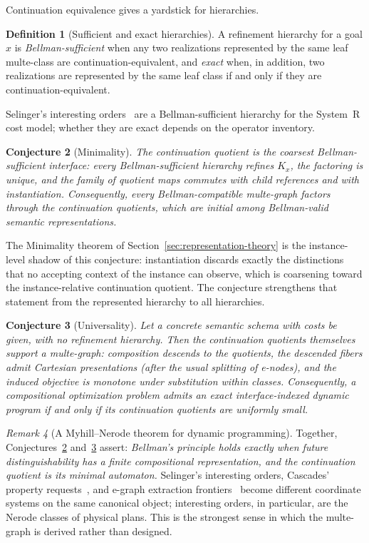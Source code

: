 \documentclass[sigconf,nonacm]{acmart}
\theoremstyle{definition}
\newtheorem{definition}{Definition}[section]
\theoremstyle{plain}
\newtheorem{conjecture}[definition]{Conjecture}
\theoremstyle{remark}
\newtheorem{remark}[definition]{Remark}
\begin{document}
Continuation equivalence gives a yardstick for hierarchies.

\begin{definition}[Sufficient and exact hierarchies]
A refinement hierarchy for a goal $x$ is \emph{Bellman-sufficient}
when any two realizations represented by the same leaf multe-class
are continuation-equivalent, and \emph{exact} when, in addition, two
realizations are represented by the same leaf class if and only if
they are continuation-equivalent.
\end{definition}

Selinger's interesting orders~\cite{selinger1979access} are a
Bellman-sufficient hierarchy for the System~R cost model; whether
they are exact depends on the operator inventory.

\begin{conjecture}[Minimality]
\label{conj:minimality}
The continuation quotient is the coarsest Bellman-sufficient
interface: every Bellman-sufficient hierarchy refines $K_x$, the
factoring is unique, and the family of quotient maps commutes with
child references and with instantiation.  Consequently, every
Bellman-compatible multe-graph factors through the continuation
quotients, which are initial among Bellman-valid semantic
representations.
\end{conjecture}

The Minimality theorem of Section~\ref{sec:representation-theory} is
the instance-level shadow of this conjecture: instantiation discards
exactly the distinctions that no accepting context of the instance
can observe, which is coarsening toward the instance-relative
continuation quotient.  The conjecture strengthens that statement
from the represented hierarchy to all hierarchies.

\begin{conjecture}[Universality]
\label{conj:universality}
Let a concrete semantic schema with costs be given, with no
refinement hierarchy.  Then the continuation quotients themselves
support a multe-graph: composition descends to the quotients, the
descended fibers admit Cartesian presentations (after the usual
splitting of e-nodes), and the induced objective is monotone under
substitution within classes.  Consequently, a compositional
optimization problem admits an exact interface-indexed dynamic
program if and only if its continuation quotients are uniformly
small.
\end{conjecture}

\begin{remark}[A Myhill--Nerode theorem for dynamic programming]
Together, Conjectures~\ref{conj:minimality}
and~\ref{conj:universality} assert: \emph{Bellman's principle holds
exactly when future distinguishability has a finite compositional
representation, and the continuation quotient is its minimal
automaton.}  Selinger's interesting orders, Cascades' property
requests~\cite{graefe1995cascades}, and e-graph extraction
frontiers~\cite{willsey2021egg} become different coordinate systems
on the same canonical object; interesting orders, in particular, are
the Nerode classes of physical plans.  This is the strongest sense
in which the multe-graph is derived rather than designed.
\end{remark}
\end{document}
